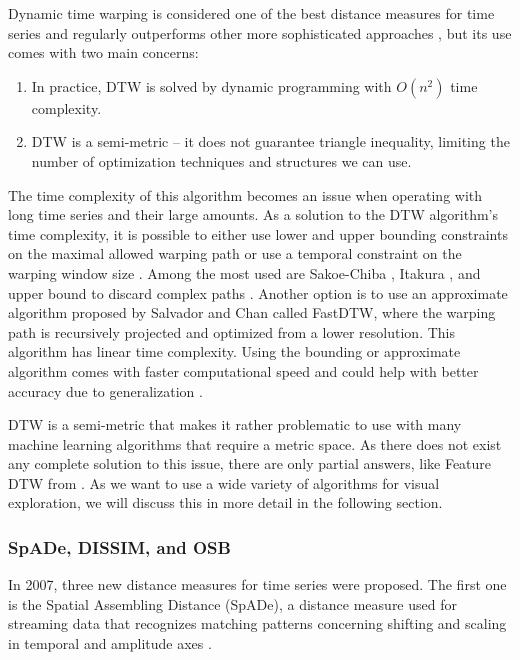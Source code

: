 Dynamic time warping is considered one of the best distance measures for time series and regularly outperforms other more sophisticated approaches \cite{met:universal, met:comparison-new, met:dtw-best-1, met:dtw-best-0}, but its use comes with two main concerns:
\begin{enumerate}
    \item In practice, DTW is solved by dynamic programming with $O(n^2)$ time complexity.
    \item DTW is a semi-metric -- it does not guarantee triangle inequality, limiting the number of optimization techniques and structures we can use.  
\end{enumerate}

The time complexity of this algorithm becomes an issue when operating with long time series and their large amounts. As a solution to the DTW algorithm's time complexity, it is possible to either use lower and upper bounding constraints on the maximal allowed warping path \cite{met:dtw-koegh-rata} or use a temporal constraint on the warping window size \cite{met:dtw-window}. Among the most used are Sakoe-Chiba \cite{met:dtw-window}, Itakura \cite{met:dtw-itakura}, and upper bound to discard complex paths \cite{met:DTW-zheng}. Another option is to use an approximate algorithm proposed by Salvador and Chan \cite{met:FastDTW} called FastDTW, where the warping path is recursively projected and optimized from a lower resolution. This algorithm has linear time complexity. Using the bounding or approximate algorithm comes with faster computational speed and could help with better accuracy due to generalization \cite{met:fDTW}.

DTW is a semi-metric that makes it rather problematic to use with many machine learning algorithms that require a metric space. As there does not exist any complete solution to this issue, there are only partial answers, like Feature DTW from \textcite{met:fDTW}. As we want to use a wide variety of algorithms for visual exploration, we will discuss this in more detail in the following section.

\subsubsection{SpADe, DISSIM, and OSB}
In 2007, three new distance measures for time series were proposed. The first one is the Spatial Assembling Distance (SpADe), a distance measure used for streaming data that recognizes matching patterns concerning shifting and scaling in temporal and amplitude axes \cite{met:spade}.

